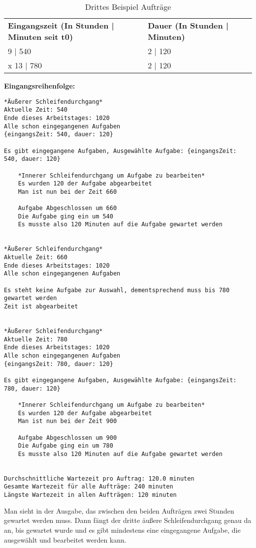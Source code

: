 \documentclass[a4paper,10pt,ngerman]{scrartcl}
\begin{document}
\begin{table}[htb]
    \centering
    \begin{tabular}{lll}
    \textbf{Eingangszeit (In Stunden | Minuten seit t0)} & \textbf{Dauer (In Stunden | Minuten)} \\
    9 | 540 & 2 | 120 \\
x    13 | 780 & 2 | 120 \\
    \end{tabular}
    \caption{Drittes Beispiel Aufträge}
    \label{tab:Table1}
 \end{table}

\textbf{Eingangsreihenfolge:}
\begin{lstlisting}[numbers=none]
*Äußerer Schleifendurchgang*
Aktuelle Zeit: 540
Ende dieses Arbeitstages: 1020
Alle schon eingegangenen Aufgaben
{eingangsZeit: 540, dauer: 120}

Es gibt eingegangene Aufgaben, Ausgewählte Aufgabe: {eingangsZeit: 540, dauer: 120}

    *Innerer Schleifendurchgang um Aufgabe zu bearbeiten*
    Es wurden 120 der Aufgabe abgearbeitet
    Man ist nun bei der Zeit 660

    Aufgabe Abgeschlossen um 660
    Die Aufgabe ging ein um 540
    Es musste also 120 Minuten auf die Aufgabe gewartet werden


*Äußerer Schleifendurchgang*
Aktuelle Zeit: 660
Ende dieses Arbeitstages: 1020
Alle schon eingegangenen Aufgaben

Es steht keine Aufgabe zur Auswahl, dementsprechend muss bis 780 gewartet werden
Zeit ist abgearbeitet


*Äußerer Schleifendurchgang*
Aktuelle Zeit: 780
Ende dieses Arbeitstages: 1020
Alle schon eingegangenen Aufgaben
{eingangsZeit: 780, dauer: 120}

Es gibt eingegangene Aufgaben, Ausgewählte Aufgabe: {eingangsZeit: 780, dauer: 120}

    *Innerer Schleifendurchgang um Aufgabe zu bearbeiten*
    Es wurden 120 der Aufgabe abgearbeitet
    Man ist nun bei der Zeit 900

    Aufgabe Abgeschlossen um 900
    Die Aufgabe ging ein um 780
    Es musste also 120 Minuten auf die Aufgabe gewartet werden


Durchschnittliche Wartezeit pro Auftrag: 120.0 minuten
Gesamte Wartezeit für alle Aufträge: 240 minuten
Längste Wartezeit in allen Aufträgen: 120 minuten
\end{lstlisting}

Man sieht in der Ausgabe, das zwischen den beiden Aufträgen zwei Stunden gewartet werden muss. 
Dann fängt der dritte äußere Schleifendurchgang genau da an, bis gewartet wurde
und es gibt mindestens eine eingegangene Aufgabe, die ausgewählt und bearbeitet werden kann.
\end{document}
